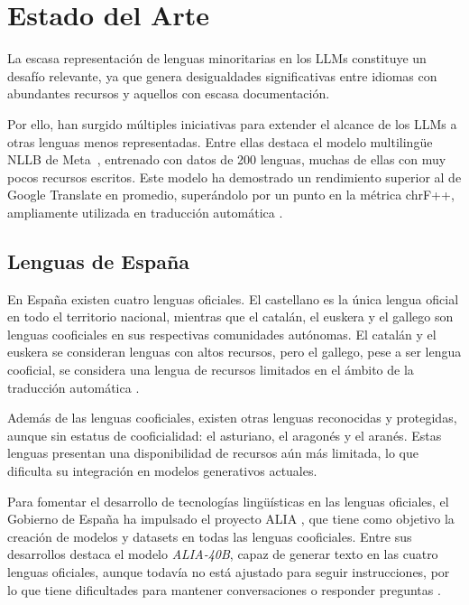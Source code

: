\chapter{Estado del Arte}
\label{ch:soa}

La escasa representación de lenguas minoritarias en los LLMs constituye un desafío relevante, ya que genera desigualdades significativas entre idiomas con abundantes recursos y aquellos con escasa documentación.

Por ello, han surgido múltiples iniciativas para extender el alcance de los LLMs a otras lenguas menos representadas. Entre ellas destaca el modelo multilingüe NLLB de Meta~\cite{nllb2022}, entrenado con datos de 200 lenguas, muchas de ellas con muy pocos recursos escritos. Este modelo ha demostrado un rendimiento superior al de Google Translate en promedio, superándolo por un punto en la métrica chrF++, ampliamente utilizada en traducción automática \cite{nllb2022}.

\section{Lenguas de España}

En España existen cuatro lenguas oficiales. El castellano es la única lengua oficial en todo el territorio nacional, mientras que el catalán, el euskera y el gallego son lenguas cooficiales en sus respectivas comunidades autónomas. El catalán y el euskera se consideran lenguas con altos recursos, pero el gallego, pese a ser lengua cooficial, se considera una lengua de recursos limitados en el ámbito de la traducción automática \cite{nllb2022}.

Además de las lenguas cooficiales, existen otras lenguas reconocidas y protegidas, aunque sin estatus de cooficialidad: el asturiano, el aragonés y el aranés. Estas lenguas presentan una disponibilidad de recursos aún más limitada, lo que dificulta su integración en modelos generativos actuales.

Para fomentar el desarrollo de tecnologías lingüísticas en las lenguas oficiales, el Gobierno de España ha impulsado el proyecto ALIA \cite{ALIA2025}, que tiene como objetivo la creación de modelos y datasets en todas las lenguas cooficiales. Entre sus desarrollos destaca el modelo \textit{ALIA-40B}, capaz de generar texto en las cuatro lenguas oficiales, aunque todavía no está ajustado para seguir instrucciones, por lo que tiene dificultades para mantener conversaciones o responder preguntas \cite{alia40b2025}.


